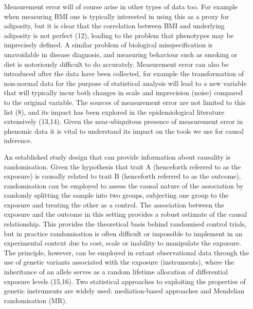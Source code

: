 \documentclass[]{article}
\begin{document}
Measurement error will of course arise in other types of data too. For
example when measuring BMI one is typically interested in using this as
a proxy for adiposity, but it is clear that the correlation between BMI
and underlying adiposity is not perfect (12), leading to the problem
that phenotypes may be imprecisely defined. A similar problem of
biological misspecification is unavoidable in disease diagnosis, and
measuring behaviour such as smoking or diet is notoriously difficult to
do accurately. Measurement error can also be introduced after the data
have been collected, for example the transformation of non-normal data
for the purpose of statistical analysis will lead to a new variable that
will typically incur both changes in scale and imprecision (noise)
compared to the original variable. The sources of measurement error are
not limited to this list (8), and its impact has been explored in the
epidemiological literature extensively (13,14). Given the
near-ubiquitous presence of measurement error in phenomic data it is
vital to understand its impact on the tools we use for causal inference.

An established study design that can provide information about causality
is randomisation. Given the hypothesis that trait A (henceforth referred
to as the exposure) is causally related to trait B (henceforth referred
to as the outcome), randomisation can be employed to assess the causal
nature of the association by randomly splitting the sample into two
groups, subjecting one group to the exposure and treating the other as a
control. The association between the exposure and the outcome in this
setting provides a robust estimate of the causal relationship. This
provides the theoretical basis behind randomised control trials, but in
practice randomisation is often difficult or impossible to implement in
an experimental context due to cost, scale or inability to manipulate
the exposure. The principle, however, can be employed in extant
observational data through the use of genetic variants associated with
the exposure (instruments), where the inheritance of an allele serves as
a random lifetime allocation of differential exposure levels (15,16).
Two statistical approaches to exploiting the properties of genetic
instruments are widely used: mediation-based approaches and Mendelian
randomisation (MR).
\end{document}
